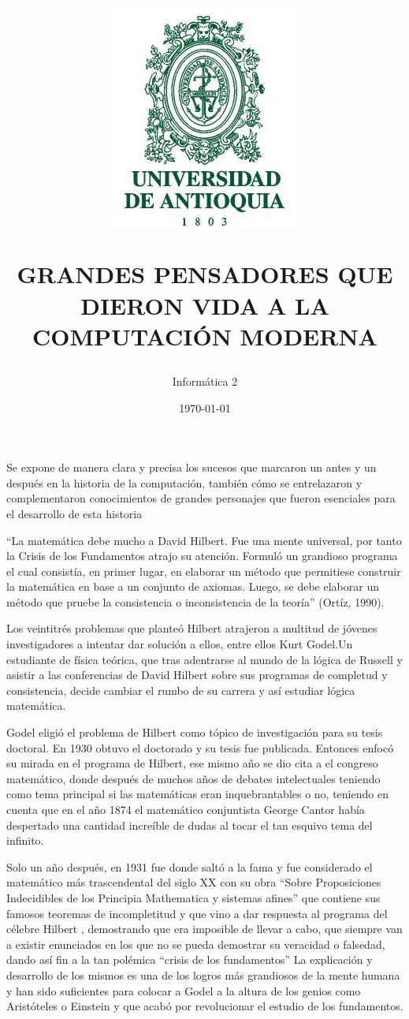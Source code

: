 \documentclass{article}
\title{      \includegraphics[scale=0.5]{logo-universidad-de-antioquia.png}

GRANDES PENSADORES QUE DIERON VIDA A LA COMPUTACIÓN MODERNA}
\author{Informática 2
}
\date{\today}
\begin{document}
\maketitle 

Se expone de manera clara y precisa los sucesos que marcaron un antes y un después en la historia de la computación, también cómo se entrelazaron y complementaron conocimientos de grandes personajes que fueron esenciales para el desarrollo de esta historia

“La matemática debe mucho a David Hilbert. Fue una mente universal,  por tanto la Crisis de los Fundamentos atrajo su atención. Formuló un grandioso programa  el cual consistía, en primer lugar, en elaborar un método que permitiese construir la matemática en base a un conjunto de axiomas. Luego, se debe elaborar un método que pruebe la consistencia o inconsistencia de la teoría” (Ortíz, 1990).

Los veintitrés problemas que planteó Hilbert atrajeron a multitud de jóvenes investigadores a intentar dar solución a ellos, entre ellos Kurt Godel.Un estudiante de física teórica, que tras adentrarse al mundo de la lógica de Russell y asistir a las conferencias de David Hilbert sobre sus programas de completud y consistencia, decide cambiar el rumbo de su carrera y así estudiar lógica matemática.

Godel eligió el problema de Hilbert como tópico de investigación para su tesis doctoral.
En 1930 obtuvo el doctorado y su tesis fue publicada. Entonces enfocó su mirada en el programa de Hilbert, ese mismo año se dio cita a el congreso matemático, donde después de muchos años de debates intelectuales teniendo como tema principal si las matemáticas eran inquebrantables o no,  teniendo en cuenta que en el año 1874 el matemático conjuntista George Cantor había despertado una cantidad increíble de dudas al tocar el tan esquivo tema del infinito.
 
Solo un año después, en 1931 fue donde saltó a la fama y fue considerado el matemático más trascendental del siglo XX  con su obra “Sobre Proposiciones Indecidibles de los Principia Mathematica y sistemas afines” que contiene sus famosos teoremas de incompletitud  y que vino a dar respuesta al programa del célebre  Hilbert , demostrando que  era imposible de llevar a cabo, que siempre van a existir enunciados en los que no se pueda demostrar su veracidad o falsedad, dando así fin a la tan polémica “crisis de los fundamentos” La explicación y desarrollo de los mismos es una de los logros más grandiosos de la mente humana y han sido suficientes para colocar a Godel a la altura de los genios como Aristóteles o Einstein y que acabó por revolucionar el estudio de los fundamentos.
 
\end{document}
